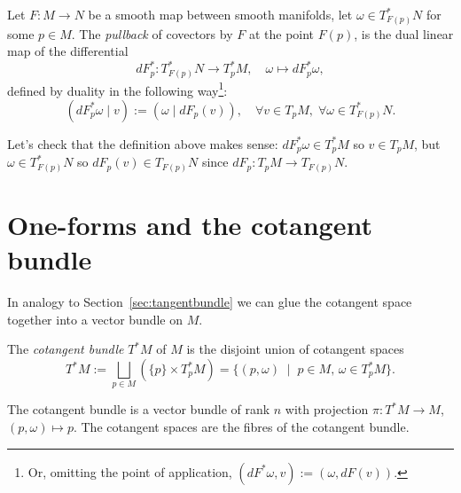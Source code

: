 \begin{definition}\label{def:pullback:oneform}
	Let $F:M\to N$ be a smooth map between smooth manifolds, let $\omega\in T^*_{F(p)}N$ for some $p\in M$.
	The \emph{pullback} of covectors by $F$ at the point $F(p)$, is the dual linear map of the differential
	\begin{equation}
		dF^*_p : T^*_{F(p)} N \to T^*_p M, \quad \omega \mapsto dF^*_p\omega,
	\end{equation}
	defined by duality in the following way\footnote{Or, omitting the point of application, $\left(dF^*\omega, v\right) := \left(\omega, dF(v)\right)$.}:
	\begin{equation}
		\left(dF^*_p\omega \mid v\right) := \left(\omega \mid dF_p(v)\right),\quad
		\forall v\in T_pM,\; \forall \omega\in T^*_{F(p)}N.
	\end{equation}
\end{definition}
\noindent Let's check that the definition above makes sense: $dF^*_p \omega \in T^*_p M$ so $v\in T_p M$, but $\omega\in T^*_{F(p)}N$ so $dF_p(v)\in T_{F(p)}N$ since $dF_p: T_pM\to T_{F(p)}N$.

\section{One-forms and the cotangent bundle}

In analogy to Section~\ref{sec:tangentbundle} we can glue the cotangent space together into a vector bundle on $M$.

\begin{definition}
	The \emph{cotangent bundle} $T^*M$ of $M$ is the disjoint union of cotangent spaces
	\begin{equation}
		T^*M := \bigsqcup_{p\in M}\left(\{p\}\times T^*_pM\right)
		= \{(p,\omega) \;\mid\; p\in M,\, \omega\in T^*_pM\}.
	\end{equation}
\end{definition}

The cotangent bundle is a vector bundle of rank $n$ with projection $\pi:T^*M\to M$, $(p,\omega)\mapsto p$.
The cotangent spaces are the fibres of the cotangent bundle.

